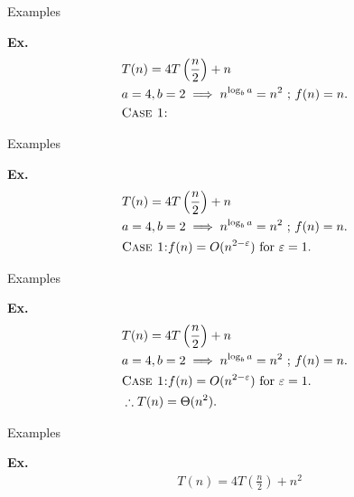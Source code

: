 \documentclass{beamer}
\begin{document}
\begin{frame}{Examples}
    \begin{exampleblock}{\textbf{Ex.}}
        \vspace{-8mm}
        \begin{align*}
            & T(n) = 4T\left(\frac{n}{2} \right) + n \\
            & a = 4, b = 2 \implies n^{\log_b a} = n^2 \text{ ; } f(n) = n \text{.} \\
            & \text{\textsc{Case 1:}} \\
        \end{align*}
    \end{exampleblock}
\end{frame}

\begin{frame}{Examples}
    \begin{exampleblock}{\textbf{Ex.}}
        \vspace{-8mm}
        \begin{align*}
            & T(n) = 4T\left(\frac{n}{2} \right) + n \\
            & a = 4, b = 2 \implies n^{\log_b a} = n^2 \text{ ; } f(n) = n \text{.} \\
            & \text{\textsc{Case 1:}} f(n) = O(n^{2 - \varepsilon}) \text{ for } \varepsilon = 1 \text{.} \\
        \end{align*}
    \end{exampleblock}
\end{frame}

\begin{frame}{Examples}
    \begin{exampleblock}{\textbf{Ex.}}
        \vspace{-8mm}
        \begin{align*}
            & T(n) = 4T\left(\frac{n}{2} \right) + n \\
            & a = 4, b = 2 \implies n^{\log_b a} = n^2 \text{ ; } f(n) = n \text{.} \\
            & \text{\textsc{Case 1:}} f(n) = O(n^{2 - \varepsilon}) \text{ for } \varepsilon = 1 \text{.} \\
            & \therefore T(n) = \Theta(n^2) \text{.} \\
        \end{align*}
    \end{exampleblock}
\end{frame}

\begin{frame}{Examples}
    \begin{exampleblock}{\textbf{Ex.}}
        \vspace{-8mm}
        \begin{align*}
            & T(n) = 4T\left(\frac{n}{2} \right) + n^2 \\
        \end{align*}
    \end{exampleblock}
\end{frame}
\end{document}
